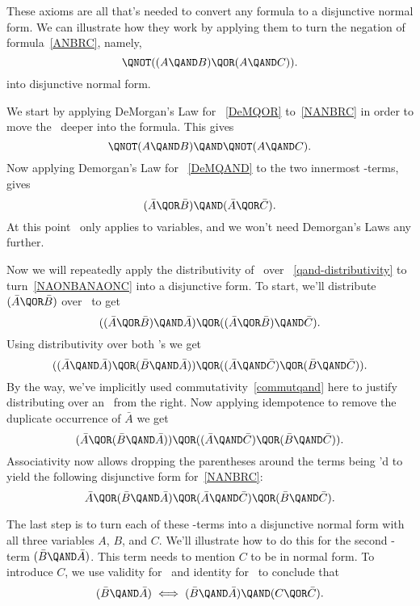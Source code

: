 These axioms are all that's needed to convert any formula to a
disjunctive normal form.  We can illustrate how they work by applying
them to turn the negation of formula~\eqref{ANBRC}, namely,
\begin{equation}\label{NANBRC}
\QNOT((A \QAND B) \QOR (A \QAND C)).
\end{equation}
into disjunctive normal form.

We start by applying DeMorgan's Law for \QOR~\eqref{DeMQOR}
to~\eqref{NANBRC} in order to move the \QNOT\ deeper into the formula.
This gives
\[
\QNOT(A \QAND B) \QAND \QNOT(A \QAND C).
\]
Now applying Demorgan's Law for \QAND~\eqref{DeMQAND} to the two
innermost \QAND-terms, gives
\begin{equation}\label{NAONBANAONC}
(\bar{A} \QOR \bar{B}) \QAND (\bar{A} \QOR \bar{C}).
\end{equation}
At this point \QNOT\ only applies to variables, and we won't need
Demorgan's Laws any further.

Now we will repeatedly apply the distributivity of \QAND\ over \QOR~\eqref{qand-distributivity} to
turn~\eqref{NAONBANAONC} into a disjunctive form.  To start, we'll distribute
$(\bar{A} \QOR \bar{B})$ over \QAND\ to get
\[
((\bar{A} \QOR \bar{B}) \QAND \bar{A}) \QOR ((\bar{A} \QOR \bar{B}) \QAND \bar{C}).
\]
Using distributivity over both \QAND's we get
\[
((\bar{A} \QAND \bar{A}) \QOR (\bar{B} \QAND \bar{A})) \QOR 
((\bar{A} \QAND \bar{C}) \QOR (\bar{B} \QAND \bar{C})).
\]
By the way, we've implicitly used commutativity~\eqref{commutqand}
here to justify distributing over an \QAND\ from the right.  Now
applying idempotence to remove the duplicate occurrence of $\bar{A}$ we
get
\[
(\bar{A} \QOR (\bar{B} \QAND \bar{A})) \QOR 
((\bar{A} \QAND \bar{C}) \QOR (\bar{B} \QAND \bar{C})).
\]
Associativity now allows dropping the parentheses around the terms
being \QOR'd to yield the following disjunctive form for~\eqref{NANBRC}:
\begin{equation}\label{DFNAONBANAONC}
\bar{A} \QOR
(\bar{B} \QAND \bar{A}) \QOR 
(\bar{A} \QAND \bar{C}) \QOR
(\bar{B} \QAND \bar{C}).
\end{equation}

The last step is to turn each of these \QAND-terms into a disjunctive
normal form with all three variables $A$, $B$, and $C$.  We'll
illustrate how to do this for the second \QAND-term
$(\bar{B} \QAND \bar{A})$.  This term needs to mention $C$ to be in
normal form.  To introduce $C$, we use validity for \QOR\ and
identity for \QAND\ to conclude that
\[
(\bar{B} \QAND \bar{A}) \iff (\bar{B} \QAND \bar{A}) \QAND (C \QOR \bar{C}).
\]


